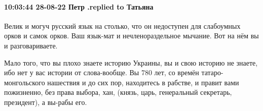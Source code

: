 
 
 
 
 

\paragraph{10:03:44 28-08-22 Петр .replied to Татьяна}

Велик и могуч русский язык на столько, что он недоступен для слабоумных орков и
самок орков. Ваш язык-мат и нечленораздельное мычание. Вот на нём вы и
разговариваете.

Мало того, что вы плохо знаете историю Украины, вы и свою историю не знаете,
ибо нет у вас истории от слова-вообще.  Вы 780 лет, со времён
татаро-монгольского нашествия и до сих пор, находитесь в рабстве, и правит вами
пожизненно, без права выбора, хан, (князь, царь, генеральный секретарь,
президент), а вы-рабы его.
